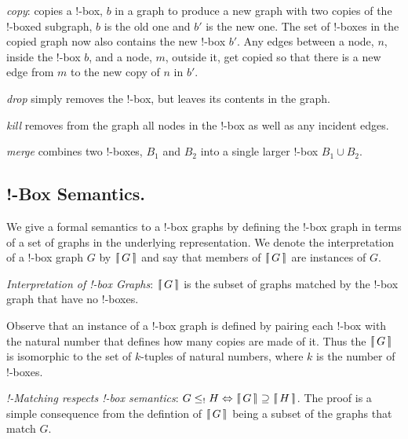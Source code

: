 \documentclass[runningheads]{llncs}
\newcommand{\binterp}[1]{\lceil\hspace{-0.27em}|\, #1\, |\hspace{-0.27em}\rceil}
\begin{document}
\begin{definition}
  \emph{copy}: copies a !-box, $b$ in a graph to produce a new graph
  with two copies of the !-boxed subgraph, $b$ is the old one and $b'$
  is the new one. The set of !-boxes in the copied graph now also
  contains the new !-box $b'$. Any edges between a node, $n$, inside
  the !-box $b$, and a node, $m$, outside it, get copied so that there
  is a new edge from $m$ to the new copy of $n$ in $b'$.
\end{definition}

\begin{definition}
  \emph{drop} simply removes the !-box, but leaves its contents in the
  graph.
\end{definition}

\begin{definition}
  \emph{kill} removes from the graph all nodes in the !-box as well as
  any incident edges.
\end{definition}

\begin{definition}
  \emph{merge} combines two !-boxes, $B_1$ and $B_2$ into a single
  larger !-box $B_1 \cup B_2$.
\end{definition}

\subsection{!-Box Semantics.} 

We give a formal semantics to a !-box graphs by defining the !-box
graph in terms of a set of graphs in the underlying representation. We
denote the interpretation of a !-box graph $G$ by $\binterp{G}$ and
say that members of $\binterp{G}$ are instances of $G$.

\begin{definition}
  \emph{Interpretation of !-box Graphs}: $\binterp{G}$ is the subset
  of graphs matched by the !-box graph that have no !-boxes.
\end{definition}

Observe that an instance of a !-box graph is defined by pairing each
!-box with the natural number that defines how many copies are made of
it. Thus the $\binterp{G}$ is isomorphic to the set of $k$-tuples of
natural numbers, where $k$ is the number of !-boxes.

\begin{theorem}
  \emph{!-Matching respects !-box semantics}: $G \leq_! H
  \Leftrightarrow \binterp{G} \supseteq \binterp{H}$. The proof is a
  simple consequence from the defintion of $\binterp{G}$ being a
  subset of the graphs that match $G$.
\end{theorem}
\end{document}

